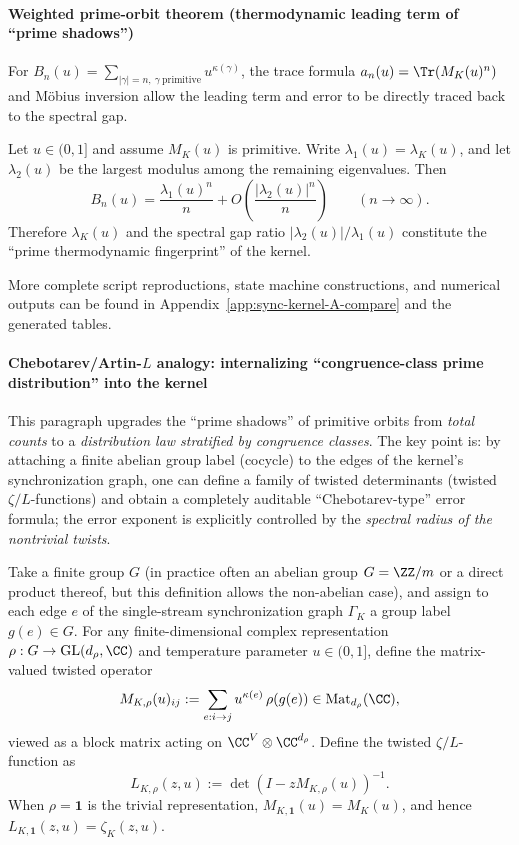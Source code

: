 \paragraph{Weighted prime-orbit theorem (thermodynamic leading term of ``prime shadows'')}
For $B_n(u)=\sum_{|\gamma|=n,\ \gamma\ \mathrm{primitive}}u^{\kappa(\gamma)}$, the trace formula $a_n(u)=\Tr(M_K(u)^n)$ and M\"obius inversion allow the leading term and error to be directly traced back to the spectral gap.

\begin{theorem}\label{thm:kernel-weighted-prime-orbit}
Let $u\in(0,1]$ and assume $M_K(u)$ is primitive. Write $\lambda_1(u)=\lambda_K(u)$, and let $\lambda_2(u)$ be the largest modulus among the remaining eigenvalues. Then
\[
B_n(u)=\frac{\lambda_1(u)^n}{n}+O\!\left(\frac{|\lambda_2(u)|^n}{n}\right)\qquad(n\to\infty).
\]
Therefore \(\lambda_K(u)\) and the spectral gap ratio \( |\lambda_2(u)|/\lambda_1(u)\) constitute the ``prime thermodynamic fingerprint'' of the kernel.
\end{theorem}

More complete script reproductions, state machine constructions, and numerical outputs can be found in Appendix~\ref{app:sync-kernel-A-compare} and the generated tables.

\paragraph{Chebotarev/Artin-\texorpdfstring{$L$}{L} analogy: internalizing ``congruence-class prime distribution'' into the kernel}
This paragraph upgrades the ``prime shadows'' of primitive orbits from \emph{total counts} to a \emph{distribution law stratified by congruence classes}. The key point is: by attaching a finite abelian group label (cocycle) to the edges of the kernel's synchronization graph, one can define a family of twisted determinants (twisted $\zeta/L$-functions) and obtain a completely auditable ``Chebotarev-type'' error formula; the error exponent is explicitly controlled by the \emph{spectral radius of the nontrivial twists}.

\begin{definition}\label{def:kernel-group-twist}
Take a finite group $G$ (in practice often an abelian group $G=\ZZ/m$ or a direct product thereof, but this definition allows the non-abelian case), and assign to each edge $e$ of the single-stream synchronization graph $\Gamma_K$ a group label $g(e)\in G$.
For any finite-dimensional complex representation $\rho:G\to\mathrm{GL}(d_\rho,\CC)$ and temperature parameter $u\in(0,1]$, define the matrix-valued twisted operator
\[
M_{K,\rho}(u)_{ij}:=\sum_{e:i\to j}u^{\kappa(e)}\,\rho(g(e))\in\mathrm{Mat}_{d_\rho}(\CC),
\]
viewed as a block matrix acting on $\CC^{V}\otimes\CC^{d_\rho}$. Define the twisted $\zeta/L$-function as
\[
L_{K,\rho}(z,u):=\det(I-zM_{K,\rho}(u))^{-1}.
\]
When $\rho=\mathbf{1}$ is the trivial representation, $M_{K,\mathbf{1}}(u)=M_K(u)$, and hence $L_{K,\mathbf{1}}(z,u)=\zeta_K(z,u)$.
\end{definition}

